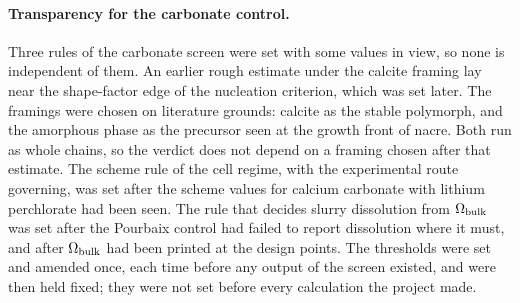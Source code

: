 \paragraph*{Transparency for the carbonate control.}
Three rules of the carbonate screen were set with some values in view, so none is independent of them. %
An earlier rough estimate under the calcite framing lay near the shape-factor edge of the nucleation criterion, which was set later. %
The framings were chosen on literature grounds: calcite as the stable polymorph, and the amorphous phase as the precursor seen at the growth front of nacre\cite{devol2015nanoscale}. %
Both run as whole chains, so the verdict does not depend on a framing chosen after that estimate. %
The scheme rule of the cell regime, with the experimental route governing, was set after the scheme values for calcium carbonate with lithium perchlorate had been seen. %
The rule that decides slurry dissolution from $\Omega_\mathrm{bulk}$ was set after the Pourbaix control had failed to report dissolution where it must, and after $\Omega_\mathrm{bulk}$ had been printed at the design points. %
The thresholds were set and amended once, each time before any output of the screen existed, and were then held fixed; they were not set before every calculation the project made. %


